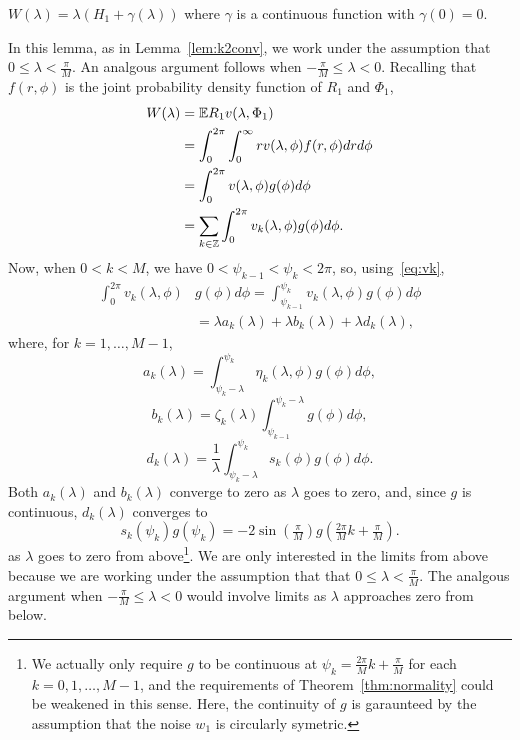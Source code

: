 \documentclass[journal]{IEEEtran}
\begin{document}
\begin{lemma}\label{lem:expRvlamphi}
$W(\lambda) =  \lambda(H_1 + \gamma(\lambda))$ where $\gamma$ is a continuous function with $\gamma(0) = 0$.
\end{lemma}
\begin{IEEEproof}
In this lemma, as in Lemma~\ref{lem:k2conv}, we work under the assumption that $0 \leq \lambda < \frac{\pi}{M}$.  An analgous argument follows when $-\tfrac{\pi}{M} \leq \lambda < 0$.  Recalling that $f(r,\phi)$ is the joint probability density function of $R_1$ and $\Phi_1$, 
\begin{align}
W(\lambda) &= {\mathbb E} R_1 v(\lambda, \Phi_1) \nonumber  \\
&= \int_0^{2\pi}\int_{0}^\infty r v(\lambda, \phi) f(r,\phi) dr d\phi \nonumber  \\ 
&= \int_0^{2\pi} v(\lambda, \phi) g(\phi) d\phi \nonumber \\
&= \sum_{k \in {\mathbb Z}} \int_0^{2\pi} v_k(\lambda, \phi) g(\phi) d\phi. \label{eq:Winfsum}
\end{align}
Now, when $0 < k < M$, we have $0 < \psi_{k-1} < \psi_k < 2\pi$, so, using~\eqref{eq:vk},
\begin{align*}
\int_0^{2\pi} v_k(\lambda, \phi) &g(\phi) d\phi = \int_{\psi_{k-1}}^{\psi_{k}} v_k(\lambda, \phi) g(\phi) d\phi \\
&= \lambda a_k(\lambda) + \lambda b_k(\lambda) + \lambda d_k(\lambda),
\end{align*}
where, for $k = 1, \dots, M-1$,
\begin{equation}\label{eq:ak}
a_k(\lambda) = \int_{\psi_k-\lambda}^{\psi_k}\eta_k(\lambda, \phi) g(\phi) d\phi,
\end{equation}
\[
b_k(\lambda) = \zeta_k(\lambda) \int_{\psi_{k-1}}^{\psi_k -\lambda}g(\phi) d\phi,
\]
\begin{equation}\label{eq:ck}
d_k(\lambda) = \frac{1}{\lambda} \int_{\psi_{k} - \lambda}^{\psi_{k}} s_k(\phi) g(\phi) d\phi.
\end{equation}
Both $a_k(\lambda)$ and $b_k(\lambda)$ converge to zero as $\lambda$ goes to zero, and, since $g$ is continuous, $d_k(\lambda)$ converges to 
\[
s_k(\psi_k)g(\psi_k) = -2\sin(\tfrac{\pi}{M}) g(\tfrac{2\pi}{M}k + \tfrac{\pi}{M}).
\]
as $\lambda$ goes to zero from above\footnote{We actually only require $g$ to be continuous at $\psi_k = \tfrac{2\pi}{M}k + \tfrac{\pi}{M}$ for each $k = 0, 1, \dots, M-1$, and the requirements of Theorem~\ref{thm:normality} could be weakened in this sense.  Here, the continuity of $g$ is garaunteed by the assumption that the noise $w_1$ is circularly symetric.}.  We are only interested in the limits from above because we are working under the assumption that that $0 \leq \lambda < \frac{\pi}{M}$.  The analgous argument when $-\tfrac{\pi}{M} \leq \lambda < 0$ would involve limits as $\lambda$ approaches zero from below.


\end{IEEEproof}
\end{document}
